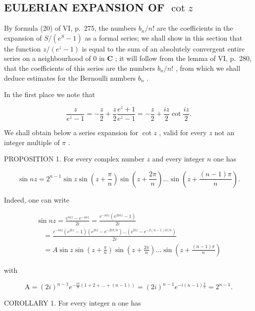 \subsection{\texorpdfstring{EULERIAN EXPANSION OF \(\cot z\)}{EULERIAN EXPANSION OF COT Z}}

By formula (20) of VI, p.~275, the numbers \(b_{n} / n!\) are the coefficients in the expansion of \(S / (e^{S} - 1)\) as a formal series; we shall show in this section that the function \(z / (e^{z} - 1)\) is equal to the sum of an absolutely convergent entire series on a neighbourhood of 0 in \(\mathbf{C}\) ; it will follow from the lemma of VI, p.~280, that the coefficients of this series are the numbers \(b_{n} / n!\) , from which we shall deduce estimates for the Bernoulli numbers \(b_{n}\) .

In the first place we note that

\[
{\frac {z}{e ^ {z} - 1}} = - {\frac {z}{2}} + {\frac {z}{2}} {\frac {e ^ {z} + 1}{e ^ {z} - 1}} = - {\frac {z}{2}} + {\frac {i z}{2}} \cot {\frac {i z}{2}}.\tag{1}
\]

We shall obtain below a series expansion for \(\cot z\) , valid for every \(z\) not an integer multiple of \(\pi\) .

PROPOSITION 1. For every complex number \(z\) and every integer \(n\) one has

\[
\sin n z = 2 ^ {n - 1} \sin z \sin \left(z + \frac {\pi}{n}\right) \sin \left(z + \frac {2 \pi}{n}\right) \dots \sin \left(z + \frac {(n - 1) \pi}{n}\right).\tag{2}
\]

Indeed, one can write

\[
\begin{array}{l} \sin n z = \frac {e ^ {n i z} - e ^ {- n i z}}{2 i} = \frac {e ^ {- n i z} (e ^ {2 n i z} - 1)}{2 i} \\ \quad = \frac {e ^ {- n i z} (e ^ {2 i z} - 1) (e ^ {2 i z} - e ^ {- 2 i \pi / n}) \dots (e ^ {2 i z} - e ^ {- 2 (n - 1) i \pi / n})}{2 i} \\ \quad = A \sin z \sin \left(z + \frac {\pi}{n}\right) \sin \left(z + \frac {2 \pi}{n}\right) \dots \sin \left(z + \frac {(n - 1) \pi}{n}\right) \end{array}
\]

with

\[
\mathrm{A} = (2 i) ^ {n - 1} e ^ {- \frac {i \pi}{n} (1 + 2 + \dots + (n - 1))} = (2 i) ^ {n - 1} e ^ {- i (n - 1) \frac {\pi}{2}} = 2 ^ {n - 1}.
\]

COROLLARY 1. For every integer n one has

